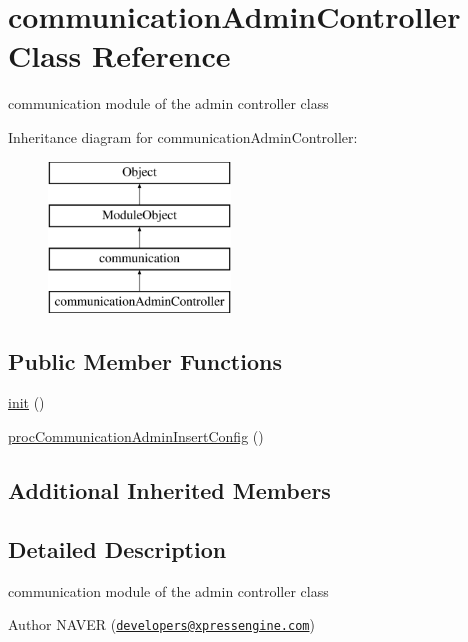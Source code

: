 \hypertarget{classcommunicationAdminController}{\section{communication\+Admin\+Controller Class Reference}
\label{classcommunicationAdminController}
}


communication module of the admin controller class  


Inheritance diagram for communication\+Admin\+Controller\+:\begin{figure}[H]
\begin{center}
\leavevmode
\includegraphics[height=4.000000cm]{classcommunicationAdminController}
\end{center}
\end{figure}
\subsection*{Public Member Functions}
\begin{DoxyCompactItemize}
\item 
\hyperlink{classcommunicationAdminController_a6ad0b759ad3a139a7cf0784f62297bfb}{init} ()
\item 
\hyperlink{classcommunicationAdminController_a23dbacf4acc643cea069d1de93b406c9}{proc\+Communication\+Admin\+Insert\+Config} ()
\end{DoxyCompactItemize}
\subsection*{Additional Inherited Members}


\subsection{Detailed Description}
communication module of the admin controller class 

\begin{DoxyAuthor}{Author}
N\+A\+V\+E\+R (\href{mailto:developers@xpressengine.com}{\tt developers@xpressengine.\+com}) 
\end{DoxyAuthor}


